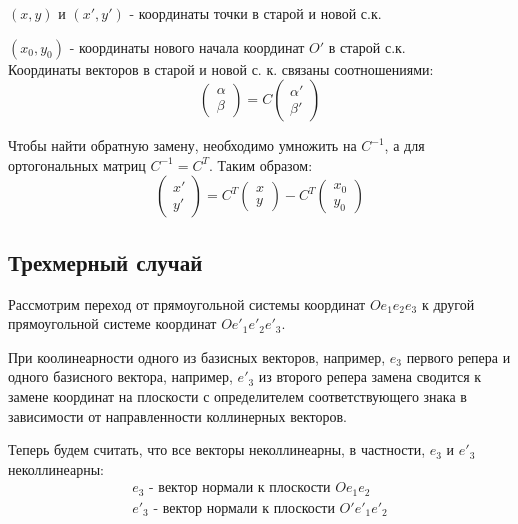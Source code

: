 \hspace{0.4cm}$(x,y)$ и $(x', y')$ - координаты точки в старой и новой с.к.

\hspace{0.4cm}$(x_0, y_0)$ - координаты нового начала координат $O'$ в старой с.к.\\

Координаты векторов в старой и новой с. к. связаны соотношениями:
$$\begin{pmatrix}
	\alpha \\ \beta
\end{pmatrix} = C \begin{pmatrix}
	\alpha' \\ \beta'
\end{pmatrix}$$

Чтобы найти обратную замену, необходимо умножить на $C^{-1}$, а для ортогональных матриц $C^{-1} = C^T$. Таким образом:
$$\begin{pmatrix}
	x' \\ y'
\end{pmatrix} = C^T \begin{pmatrix}
	x \\ y
\end{pmatrix} - C^T \begin{pmatrix}
	x_0 \\ y_0
\end{pmatrix}$$

\newpage
\subsection{Трехмерный случай}\label{coords:alg:3dim}

Рассмотрим переход от прямоугольной системы координат $O e_1 e_2 e_3$ к другой прямоугольной системе координат $O e'_1 e'_2 e'_3$.

При коолинеарности одного из базисных векторов, например, $e_3$ первого репера и одного базисного вектора, например, $e'_3$ из второго репера замена сводится к замене координат на плоскости с определителем соответствующего знака в зависимости от направленности коллинерных векторов.

Теперь будем считать, что все векторы неколлинеарны, в частности, $e_3$ и $e'_3$ неколлинеарны:
$$\begin{gathered}
	e_3 \text{ - вектор нормали к плоскости } O e_1 e_2 \\
	e'_3 \text{ - вектор нормали к плоскости } O' e'_1 e'_2
\end{gathered}$$

